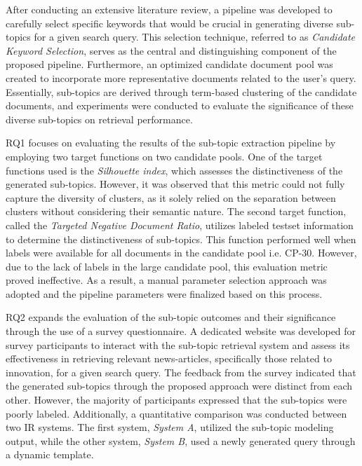 After conducting an extensive literature review, a pipeline was developed to carefully select specific keywords that would be crucial in generating diverse sub-topics for a given search query. This selection technique, referred to as \emph{Candidate Keyword Selection}, serves as the central and distinguishing component of the proposed pipeline. Furthermore, an optimized candidate document pool was created to incorporate more representative documents related to the user's query. Essentially, sub-topics are derived through term-based clustering of the candidate documents, and experiments were conducted to evaluate the significance of these diverse sub-topics on retrieval performance.


RQ1 focuses on evaluating the results of the sub-topic extraction pipeline by employing two target functions on two candidate pools. One of the target functions used is the \emph{Silhouette index}, which assesses the distinctiveness of the generated sub-topics. However, it was observed that this metric could not fully capture the diversity of clusters, as it solely relied on the separation between clusters without considering their semantic nature. The second target function, called the \textit{Targeted Negative Document Ratio}, utilizes labeled testset information to determine the distinctiveness of sub-topics. This function performed well when labels were available for all documents in the candidate pool i.e. CP-30. However, due to the lack of labels in the large candidate pool, this evaluation metric proved ineffective. As a result, a manual parameter selection approach was adopted and the pipeline parameters were finalized based on this process. 

RQ2 expands the evaluation of the sub-topic outcomes and their significance through the use of a survey questionnaire. A dedicated website was developed for survey participants to interact with the sub-topic retrieval system and assess its effectiveness in retrieving relevant news-articles, specifically those related to innovation, for a given search query. The feedback from the survey indicated that the generated sub-topics through the proposed approach were distinct from each other. However, the majority of participants expressed that the sub-topics were poorly labeled. Additionally, a quantitative comparison was conducted between two \ac{IR} systems. The first system, \emph{System A}, utilized the sub-topic modeling output, while the other system, \emph{System B}, used a newly generated query through a dynamic template.

